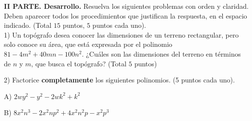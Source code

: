 \documentclass[fleqn]{article}
\begin{document}
\pagebreak

{\bf II PARTE. Desarrollo.} Resuelva los siguientes problemas con orden y claridad. Deben aparecer todos los procedimientos que justifican la respuesta, en el espacio indicado. (Total $15$ puntos, $5$ puntos cada uno). \\

1) Un topógrafo desea conocer las dimensiones de un terreno rectangular, pero solo conoce su área, que está expresada por el polinomio $81-4m^2+40mn-100n^2$. ¿Cuáles son las dimensiones del terreno en términos de $n$ y $m$, que busca el topógrafo? (Total $5$ puntos)

\vs\vs\vs\vs\vs\vs\vs\vs\vs\vs\vs\vs

2) Factorice {\bf completamente} los siguientes polinomios. (5 puntos cada uno).

\benu
\item [A)] $2wy^2-y^2-2wk^2+k^2$

\vs\vs\vs\vs\vs\vs\vs\vs\vs\vs\vs\vs\vs\vs

\item[B)] $8x^2n^3-2x^2np^2+4x^2n^2p-x^2p^3$
\eenu
\end{document}
